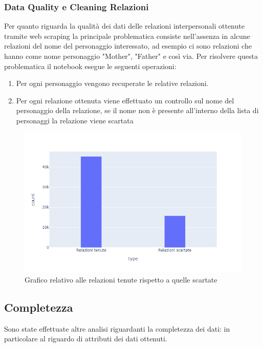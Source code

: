 \documentclass[
10pt, %
a4paper, %
oneside, %
headinclude,footinclude, %
BCOR5mm, %
]{scrartcl}
\begin{document}
\subsubsection{Data Quality e Cleaning Relazioni}
Per quanto riguarda la qualità dei dati delle relazioni interpersonali ottenute tramite web scraping la principale problematica consiste nell'assenza in alcune relazioni del nome del personaggio interessato, ad esempio ci sono relazioni che hanno come nome personaggio "Mother", "Father" e così via.
Per risolvere questa problematica il notebook esegue le seguenti operazioni:
\begin{enumerate}
	\item Per ogni personaggio vengono recuperate le relative relazioni.
	\item Per ogni relazione ottenuta viene effettuato un controllo sul nome del personaggio della relazione, se il nome non è presente all'interno della lista di personaggi la relazione viene scartata
\end{enumerate}
\begin{figure}[H]
  \includegraphics[scale=0.5]{plot_relazioni.png}
  \caption{Grafico relativo alle relazioni tenute rispetto a quelle scartate}
\end{figure}
\subsection{Completezza}
Sono state effettuate altre analisi riguardanti la completezza dei dati: in particolare al riguardo di attributi dei dati ottenuti.
\end{document}
